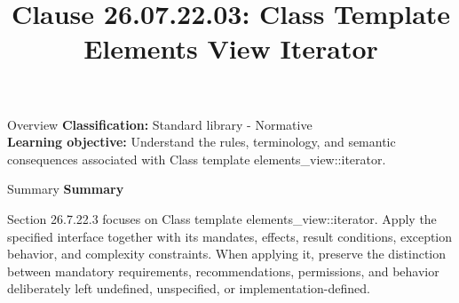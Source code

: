 \documentclass[10pt,letterpaper]{article}
\title{Clause 26.07.22.03: Class Template Elements View Iterator}
\author{}
\date{}
\begin{document}
\maketitle
\begin{CornellOverviewBox}{Overview}
\textbf{Classification:} Standard library - Normative\\[2pt]
\textbf{Learning objective:} Understand the rules, terminology, and semantic consequences associated with Class template elements\_view::iterator.
\end{CornellOverviewBox}\begin{CornellSummaryBox}{Summary}
{\sffamily\bfseries\color{Accent} Summary}\par\vspace{3pt}Section 26.7.22.3 focuses on Class template elements\_view::iterator. Apply the specified interface together with its mandates, effects, result conditions, exception behavior, and complexity constraints. When applying it, preserve the distinction between mandatory requirements, recommendations, permissions, and behavior deliberately left undefined, unspecified, or implementation-defined.
\end{CornellSummaryBox}
\end{document}

